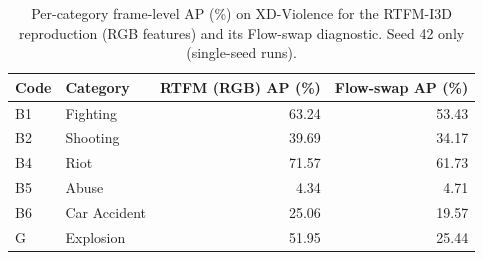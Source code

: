 \begin{table}[t]
\centering
\caption{Per-category frame-level AP (\%) on XD-Violence for the RTFM-I3D reproduction (RGB features) and its Flow-swap diagnostic. Seed 42 only (single-seed runs).}
\label{tab:percat-rtfm}
\begin{tabular}{llrr}
\toprule
Code & Category & RTFM (RGB) AP (\%) & Flow-swap AP (\%) \\
\midrule
B1 & Fighting & 63.24 & 53.43 \\
B2 & Shooting & 39.69 & 34.17 \\
B4 & Riot & 71.57 & 61.73 \\
B5 & Abuse & 4.34 & 4.71 \\
B6 & Car Accident & 25.06 & 19.57 \\
G & Explosion & 51.95 & 25.44 \\
\bottomrule
\end{tabular}
\end{table}
